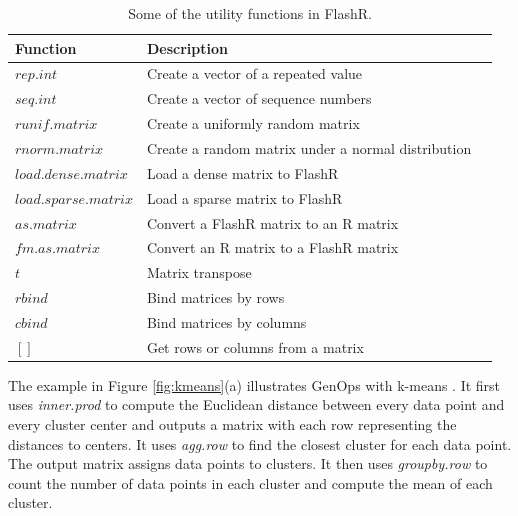 \begin{table}
\begin{center}
\footnotesize
\begin{tabular}{|l|l|l|}
\hline
Function & Description \\
\hline
$rep.int$ & Create a vector of a repeated value \\
$seq.int$ & Create a vector of sequence numbers \\
$runif.matrix$ & Create a uniformly random matrix  \\
$rnorm.matrix$ & Create a random matrix under a normal distribution \\
\hline
$load.dense.matrix$ & Load a dense matrix to FlashR \\
$load.sparse.matrix$ & Load a sparse matrix to FlashR \\
\hline
$as.matrix$ & Convert a FlashR matrix to an R matrix \\
$fm.as.matrix$ & Convert an R matrix to a FlashR matrix \\
\hline
$t$ & Matrix transpose \\
$rbind$ & Bind matrices by rows \\
$cbind$ & Bind matrices by columns \\
$[]$ & Get rows or columns from a matrix \\
\hline
\end{tabular}
\normalsize
\end{center}
\caption{Some of the utility functions in FlashR.}
\label{tbl:utility}
\end{table}

The example in Figure \ref{fig:kmeans}(a) illustrates GenOps with k-means
\cite{kmeans}. It first uses \textit{inner.prod} to
compute the Euclidean distance between every data point and every cluster center
and outputs a matrix with each row representing the distances to centers.  
It uses \textit{agg.row} to find the closest
cluster for each data point.  The output matrix 
assigns data points to clusters. It then uses \textit{groupby.row} to count
the number of data points in each cluster and compute the mean of each cluster.

